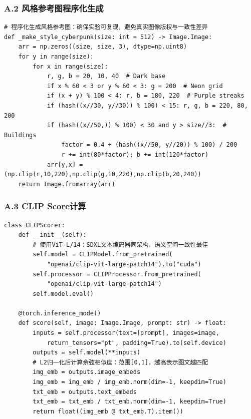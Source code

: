 \documentclass[12pt,a4paper]{ctexart}
\begin{document}
\subsubsection*{A.2 风格参考图程序化生成}

\begin{lstlisting}[style=pycode, caption={风格参考图程序化生成（evaluation.py节选）}]
# 程序化生成风格参考图：确保实验可复现，避免真实图像版权与一致性差异
def _make_style_cyberpunk(size: int = 512) -> Image.Image:
    arr = np.zeros((size, size, 3), dtype=np.uint8)
    for y in range(size):
        for x in range(size):
            r, g, b = 20, 10, 40  # Dark base
            if x % 60 < 3 or y % 60 < 3: g = 200  # Neon grid
            if (x + y) % 100 < 4: r, b = 180, 220  # Purple streaks
            if (hash((x//30, y//30)) % 100) < 15: r, g, b = 220, 80, 200
            if (hash((x//50,)) % 100) < 30 and y > size//3:  # Buildings
                factor = 0.4 + (hash((x//50, y//20)) % 100) / 200
                r += int(80*factor); b += int(120*factor)
            arr[y,x] = (np.clip(r,10,220),np.clip(g,10,220),np.clip(b,20,240))
    return Image.fromarray(arr)
\end{lstlisting}

\subsubsection*{A.3 CLIP Score计算}

\begin{lstlisting}[style=pycode, caption={CLIP Score计算（evaluation.py节选）}]
class CLIPScorer:
    def __init__(self):
        # 使用ViT-L/14：SDXL文本编码器同架构，语义空间一致性最佳
        self.model = CLIPModel.from_pretrained(
            "openai/clip-vit-large-patch14").to("cuda")
        self.processor = CLIPProcessor.from_pretrained(
            "openai/clip-vit-large-patch14")
        self.model.eval()

    @torch.inference_mode()
    def score(self, image: Image.Image, prompt: str) -> float:
        inputs = self.processor(text=[prompt], images=image,
            return_tensors="pt", padding=True).to(self.device)
        outputs = self.model(**inputs)
        # L2归一化后计算余弦相似度：范围[0,1]，越高表示图文越匹配
        img_emb = outputs.image_embeds
        img_emb = img_emb / img_emb.norm(dim=-1, keepdim=True)
        txt_emb = outputs.text_embeds
        txt_emb = txt_emb / txt_emb.norm(dim=-1, keepdim=True)
        return float((img_emb @ txt_emb.T).item())
\end{lstlisting}
\end{document}
